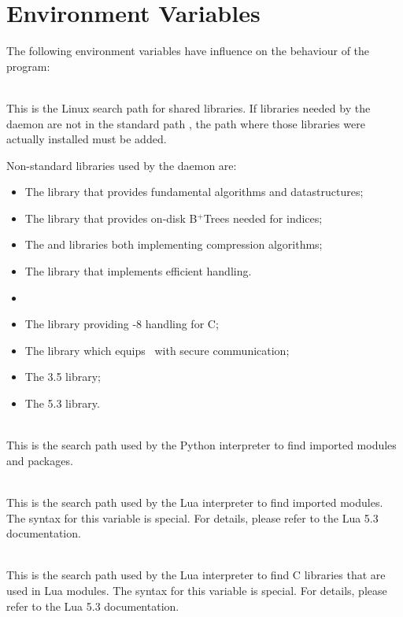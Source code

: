 \clearpage
\section{Environment Variables}
The following environment variables have influence
on the behaviour of the program:

\\
This is the Linux search path for shared libraries.
If libraries needed by the daemon are not in
the standard path , the path
where those libraries were actually installed
must be added.

\begin{minipage}{\textwidth}
Non-standard libraries used by the daemon are:

\begin{itemize}
\item The  library that provides
      fundamental algorithms and datastructures;
\item The  library that provides
      on-disk B$^+$Trees needed for indices;
\item The  and  libraries
      both implementing compression algorithms;
\item The  library that implements
      efficient  handling.
\item {}
\item The  library providing -8
      handling for C;
\item The  library which equips
      \nowdb\ with secure communication;    
\item The  3.5 library;
\item The  5.3 library.
\end{itemize}
\end{minipage}

\\
This is the search path used by the Python interpreter
to find imported modules and packages.

\\
This is the search path used by the Lua interpreter
to find imported modules.
The syntax for this variable is special.
For details, please refer to the Lua 5.3 documentation.

\\
This is the search path used by the Lua interpreter
to find C libraries that are used in Lua modules.
The syntax for this variable is special.
For details, please refer to the Lua 5.3 documentation.


